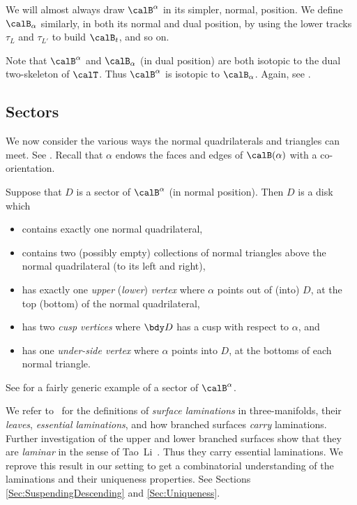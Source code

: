 \documentclass[12pt]{amsart}
\begin{document}
We will almost always draw $\calB^\alpha$ in its simpler, normal, position.  We define $\calB_\alpha$ similarly, in both its normal and dual position, by using the lower tracks $\tau_L$ and $\tau_{L'}$ to build $\calB_t$, and so on. 

\begin{remark}
\label{Rem:Dual}
Note that $\calB^\alpha$ and $\calB_\alpha$ (in dual position) are both isotopic to the dual two-skeleton of $\calT$.  Thus $\calB^\alpha$ is isotopic to $\calB_\alpha$.  Again, see .
\end{remark}

\subsection{Sectors}
\label{Sec:Sectors}

We now consider the various ways the normal quadrilaterals and triangles can meet. See .  Recall that $\alpha$ endows the faces and edges of $\calB(\alpha)$ with a co-orientation. 

\begin{remark}
\label{Rem:Sector}
Suppose that $D$ is a sector of $\calB^\alpha$ (in normal position).  Then $D$ is a disk which 
\begin{itemize}
\item
contains exactly one normal quadrilateral, 
\item
contains two (possibly empty) collections of normal triangles above the normal quadrilateral (to its left and right), 
\item
has exactly one \emph{upper} (\emph{lower}) \emph{vertex} where $\alpha$ points out of (into) $D$, at the top (bottom) of the normal quadrilateral, 
\item
has two \emph{cusp vertices} where $\bdy D$ has a cusp with respect to $\alpha$, and 
\item
has one \emph{under-side vertex} where $\alpha$ points into $D$, at the bottoms of each normal triangle. \qedhere
\end{itemize}
\end{remark}

See  for a fairly generic example of a sector of $\calB^\alpha$.  

We refer to~\cite[Definitions~6.9 and~6.14, page~215]{Calegari07} for the definitions of \emph{surface laminations} in three-manifolds, their \emph{leaves}, \emph{essential laminations}, and how branched surfaces \emph{carry} laminations.
Further investigation of the upper and lower branched surfaces show that they are \emph{laminar} in the sense of Tao~Li~\cite[Definition~1.4]{Li02}.  Thus they carry essential laminations.  We reprove this result in our setting to get a combinatorial understanding of the laminations and their uniqueness properties.  See Sections \ref{Sec:SuspendingDescending} and \ref{Sec:Uniqueness}.
\end{document}
